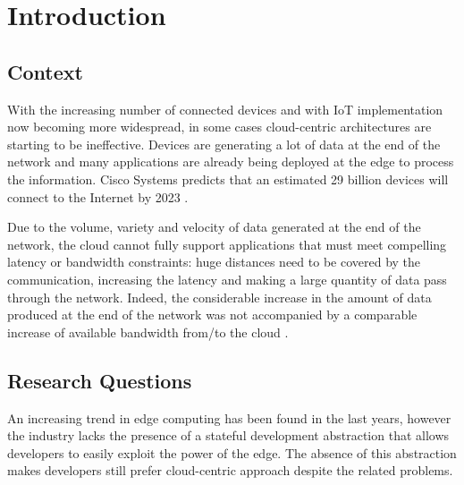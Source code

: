 \chapter{Introduction}

\section{Context}


With the increasing number of connected devices and with \gls{IoT} implementation now becoming more widespread, in some cases cloud-centric architectures are starting to be ineffective. Devices are generating a lot of data at the end of the network and many applications are already being deployed at the edge to process the information.
Cisco Systems predicts that an estimated 29 billion devices will connect to the Internet by 2023 \cite{cisco2018-2023}.

Due to the volume, variety and velocity of data generated at the end of the network, the cloud cannot fully support applications that must meet compelling latency or bandwidth constraints: huge distances need to be covered by the communication, increasing the latency and making a large quantity of data pass through the network.
Indeed, the considerable increase in the amount of data produced at the end of the network was not accompanied by a comparable increase of available bandwidth from/to the cloud \cite{promise-of-edge-computing}.



\section{Research Questions}
An increasing trend in edge computing has been found in the last years, however the industry lacks the presence of a stateful development abstraction that allows developers to easily exploit the power of the edge. The absence of this abstraction makes developers still prefer cloud-centric approach despite the related problems.

